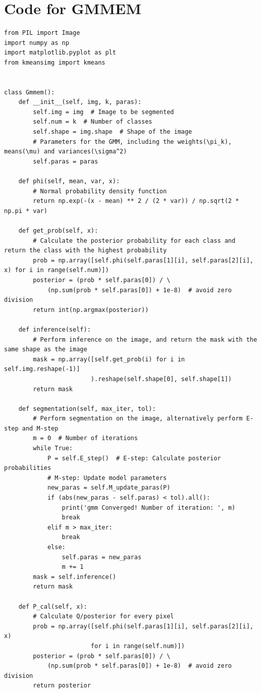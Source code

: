 \documentclass[UTF8]{ctexart}
\begin{document}
\newpage
\appendix
\hypertarget{code1}{\section{Code for GMMEM}}
\begin{lstlisting}
from PIL import Image
import numpy as np
import matplotlib.pyplot as plt
from kmeansimg import kmeans


class Gmmem():
    def __init__(self, img, k, paras):
        self.img = img  # Image to be segmented
        self.num = k  # Number of classes
        self.shape = img.shape  # Shape of the image
        # Parameters for the GMM, including the weights(\pi_k), means(\mu) and variances(\sigma^2)
        self.paras = paras

    def phi(self, mean, var, x):
        # Normal probability density function
        return np.exp(-(x - mean) ** 2 / (2 * var)) / np.sqrt(2 * np.pi * var)

    def get_prob(self, x):
        # Calculate the posterior probability for each class and return the class with the highest probability
        prob = np.array([self.phi(self.paras[1][i], self.paras[2][i], x) for i in range(self.num)])
        posterior = (prob * self.paras[0]) / \
            (np.sum(prob * self.paras[0]) + 1e-8)  # avoid zero division
        return int(np.argmax(posterior))

    def inference(self):
        # Perform inference on the image, and return the mask with the same shape as the image
        mask = np.array([self.get_prob(i) for i in self.img.reshape(-1)]
                        ).reshape(self.shape[0], self.shape[1])
        return mask

    def segmentation(self, max_iter, tol):
        # Perform segmentation on the image, alternatively perform E-step and M-step
        m = 0  # Number of iterations
        while True:
            P = self.E_step()  # E-step: Calculate posterior probabilities
            # M-step: Update model parameters
            new_paras = self.M_update_paras(P)
            if (abs(new_paras - self.paras) < tol).all():
                print('gmm Converged! Number of iteration: ', m)
                break
            elif m > max_iter:
                break
            else:
                self.paras = new_paras
                m += 1
        mask = self.inference()
        return mask

    def P_cal(self, x):
        # Calculate Q/posterior for every pixel
        prob = np.array([self.phi(self.paras[1][i], self.paras[2][i], x)
                        for i in range(self.num)])
        posterior = (prob * self.paras[0]) / \
            (np.sum(prob * self.paras[0]) + 1e-8)  # avoid zero division
        return posterior


\end{lstlisting}
\end{document}
